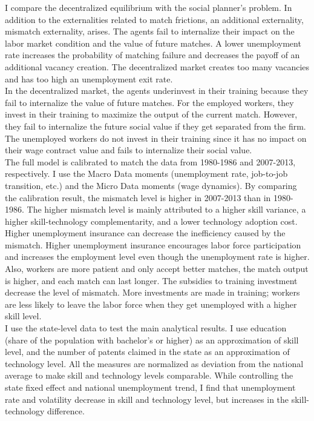 \documentclass[12pt]{article}
\newcommand{\1}{\mathbb{1}}
\begin{document}
I compare the decentralized equilibrium with the social planner's problem. In addition to the externalities related to match frictions, an additional externality, mismatch externality, arises. The agents fail to internalize their impact on the labor market condition and the value of future matches. A lower unemployment rate increases the probability of matching failure and decreases the payoff of an additional vacancy creation. The decentralized market creates too many vacancies and has too high an unemployment exit rate.  \\

In the decentralized market, the agents underinvest in their training because they fail to internalize the value of future matches. For the employed workers, they invest in their training to maximize the output of the current match. However, they fail to internalize the future social value if they get separated from the firm. The unemployed workers do not invest in their training since it has no impact on their wage contract value and fails to internalize their social value. \\


The full model is calibrated to match the data from 1980-1986 and 2007-2013, respectively. I use the Macro Data moments (unemployment rate, job-to-job transition, etc.) and the Micro Data moments (wage dynamics). By comparing the calibration result, the mismatch level is higher in 2007-2013 than in 1980-1986. The higher mismatch level is mainly attributed to a higher skill variance, a higher skill-technology complementarity, and a lower technology adoption cost.  \\

Higher unemployment insurance can decrease the inefficiency caused by the mismatch. Higher unemployment insurance encourages labor force participation and increases the employment level even though the unemployment rate is higher.  Also, workers are more patient and only accept better matches, the match output is higher, and each match can last longer.  The subsidies to training investment decrease the level of mismatch. More investments are made in training; workers are less likely to leave the labor force when they get unemployed with a higher skill level.  \\

I use the state-level data to test the main analytical results. I use education (share of the population with bachelor's or higher) as an approximation of skill level, and the number of patents claimed in the state as an approximation of technology level. All the measures are normalized as deviation from the national average to make skill and technology levels comparable. While controlling the state fixed effect and national unemployment trend, I find that unemployment rate and volatility decrease in skill and technology level, but increases in the skill-technology difference.  \\
\end{document}
